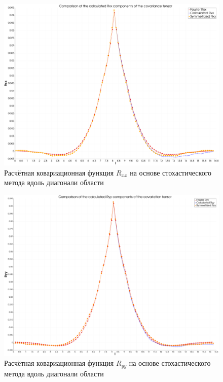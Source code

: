 \begin{figure}[ht] 
  \center
  \includegraphics [width=0.8\linewidth] {images/kriging/3components/diagonal_r11_x.png}
  \caption{Расчётная ковариационная функция $R_{xx}$ на основе стохастического метода вдоль диагонали области } 
  \label{img:kriging_covariances_diag}  
\end{figure}

\begin{figure}[ht] 
  \center
  \includegraphics [width=0.8\linewidth] {images/kriging/3components/diagonal_r22_yy.png}
  \caption{Расчётная ковариационная функция $R_{yy}$ на основе стохастического метода вдоль диагонали области } 
  \label{img:kriging_covariances_diag}  
\end{figure}

